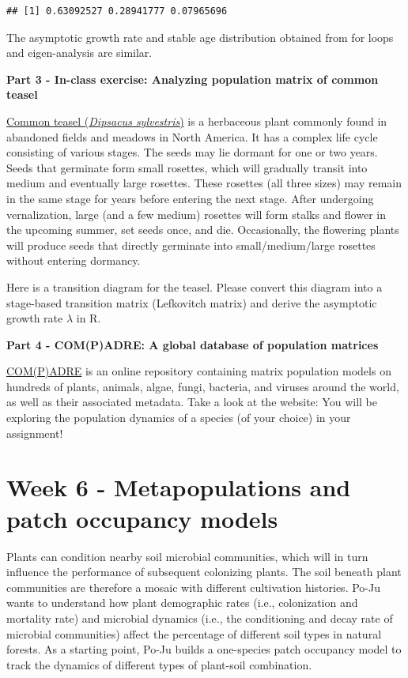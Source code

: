 \documentclass[
]{book}
\begin{document}
\begin{verbatim}
## [1] 0.63092527 0.28941777 0.07965696
\end{verbatim}

The asymptotic growth rate and stable age distribution obtained from for loops and eigen-analysis are similar.

\textbf{Part 3 - In-class exercise: Analyzing population matrix of common teasel}

\href{https://en.wikipedia.org/wiki/Dipsacus_fullonum}{Common teasel (\emph{Dipsacus sylvestris})} is a herbaceous plant commonly found in abandoned fields and meadows in North America. It has a complex life cycle consisting of various stages. The seeds may lie dormant for one or two years. Seeds that germinate form small rosettes, which will gradually transit into medium and eventually large rosettes. These rosettes (all three sizes) may remain in the same stage for years before entering the next stage. After undergoing vernalization, large (and a few medium) rosettes will form stalks and flower in the upcoming summer, set seeds once, and die. Occasionally, the flowering plants will produce seeds that directly germinate into small/medium/large rosettes without entering dormancy.

Here is a transition diagram for the teasel. Please convert this diagram into a stage-based transition matrix (Lefkovitch matrix) and derive the asymptotic growth rate \(\lambda\) in R.

\textbf{Part 4 - COM(P)ADRE: A global database of population matrices}

\href{https://compadre-db.org/ExploreDatabase}{COM(P)ADRE} is an online repository containing matrix population models on hundreds of plants, animals, algae, fungi, bacteria, and viruses around the world, as well as their associated metadata. Take a look at the website: You will be exploring the population dynamics of a species (of your choice) in your assignment!

\hypertarget{week-6---metapopulations-and-patch-occupancy-models}{%
\chapter*{Week 6 - Metapopulations and patch occupancy models}\label{week-6---metapopulations-and-patch-occupancy-models}}

Plants can condition nearby soil microbial communities, which will in turn influence the performance of subsequent colonizing plants. The soil beneath plant communities are therefore a mosaic with different cultivation histories. Po-Ju wants to understand how plant demographic rates (i.e., colonization and mortality rate) and microbial dynamics (i.e., the conditioning and decay rate of microbial communities) affect the percentage of different soil types in natural forests. As a starting point, Po-Ju builds a one-species patch occupancy model to track the dynamics of different types of plant-soil combination.
\end{document}
